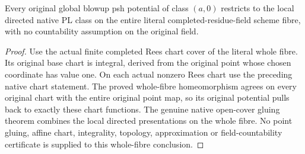 \begin{theorem}
\label{thm:fc-whole-completed-fibre-directed-pl}
\leanok
{}
Every original global blowup psh potential of class $(a,0)$ restricts to the
local directed native PL class on the entire literal completed-residue-field
scheme fibre, with no countability assumption on the original field.
\end{theorem}
\begin{proof}
Use the actual finite completed Rees chart cover of the literal whole fibre.
Its original base chart is integral, derived from the original point whose
chosen coordinate has value one. On each actual nonzero Rees chart use the
preceding native chart statement. The proved whole-fibre homeomorphism agrees
on every original chart with the entire original point map, so its original
potential pulls back to exactly these chart functions. The genuine native
open-cover gluing theorem combines the local directed presentations on the
whole fibre. No point gluing, affine chart, integrality, topology, approximation
or field-countability certificate is supplied to this whole-fibre conclusion.
\end{proof}
